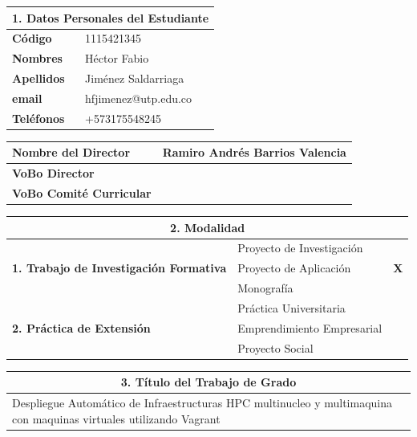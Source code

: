 \documentclass[letter,12pt]{article}
\begin{document}
\sloppy %
\renewcommand{\arraystretch}{1.1} %
\begin{center}
\begin{tabular}{|p{5.5cm}|p{9.5cm}|}
\hline
\multicolumn{2}{|c|}{\textbf{1. Datos Personales del Estudiante}}\\
\hline
\textbf{Código} & 1115421345 \\
\hline
\textbf{Nombres} & Héctor Fabio\\
\hline
\textbf{Apellidos} & Jiménez Saldarriaga\\
\hline
\textbf{email} & hfjimenez@utp.edu.co \\
\hline
\textbf{Teléfonos} &  +573175548245 \\
\hline
\end{tabular}
\end{center}

\begin{center}
\begin{tabular}{|p{5.5cm}|p{9.5cm}|}
\hline
\textbf{Nombre del Director} & Ramiro Andrés Barrios Valencia \\
\hline
\textbf{VoBo Director} &  \\
\hline
\textbf{VoBo Comité Curricular} &  \\
\hline
\end{tabular}
\end{center}
\begin{center}
\begin{tabular}{|p{5.5cm}|p{8.5cm}|p{0.5cm}|}
\hline
\multicolumn{3}{|c|}{\textbf{2. Modalidad}}\\
\hline
\multirow{3}{5cm}{\textbf{1. Trabajo de Investigación Formativa}} & Proyecto de Investigación &  \\ \cline{2-3}
& Proyecto de Aplicación &  \textbf{X}\\ \cline{2-3}
& Monografía &  \\ 
\hline
\multirow{3}{5cm}{\textbf{2. Práctica de Extensión}} & Práctica Universitaria &  \\ \cline{2-3}
& Emprendimiento Empresarial &  \\ \cline{2-3}
& Proyecto Social &  \\
\hline
\end{tabular}
\end{center}
\newpage
\begin{center}
\begin{tabular}{|p{15.5cm}|}
\hline
\multicolumn{1}{|c|}{ \textbf{3. Título del Trabajo de Grado}}\\
\hline
Despliegue Automático de Infraestructuras HPC multinucleo y multimaquina con maquinas virtuales utilizando Vagrant\\
\hline
\end{tabular}
\end{center}
    
\end{document}
